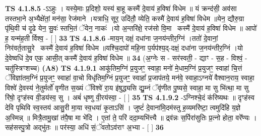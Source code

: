 \documentclass[17pt]{extarticle}
\begin{document}
                  \newline
                                \textbf{ TS 4.1.8.5} \newline
                  -ऽऽहुः । यस्ये॒माः प्र॒दिशो॒ यस्य॑ बा॒हू कस्मै॑ दे॒वाय॑ ह॒विषा॑ विधेम ॥ यं क्रन्द॑सी॒ अव॑सा तस्तभा॒ने अ॒भ्यैक्षे॑तां॒ मन॑सा॒ रेज॑माने ।यत्राधि॒ सूर॒ उदि॑तौ॒ व्येति॒ कस्मै॑ दे॒वाय॑ ह॒विषा॑ विधेम ॥येन॒ द्यौरु॒ग्रा पृ॑थि॒वी च॑ दृ॒ढे येन॒ सु॒वः॑ स्तभि॒तं ॅयेन॒ नाकः॑ ।यो अ॒न्तरि॑क्षे॒ रज॑सो वि॒मानः᳡कस्मै॑ दे॒वाय॑ ह॒विषा॑ विधेम ॥ आपो॑ ह॒ यन्म॑ह॒ती र्विश्व॒ - [  ] \textbf{  33} \newline
                  \newline
                                \textbf{ TS 4.1.8.6} \newline
                  -माय॒न् दक्षं॒ दधा॑ना ज॒नय॑न्तीर॒ग्निं ।ततो॑ दे॒वानां॒ निर॑वर्त॒तासु॒रेकः᳡कस्मै॑ दे॒वाय॑ ह॒विषा॑ विधेम ॥यश्चि॒दापो॑ महि॒ना प॒र्यप॑श्य॒द्-दक्षं॒ दधा॑ना ज॒नय॑न्तीर॒ग्निं ।यो दे॒वेष्वधि॑ दे॒व एक॒ आसी॒त् कस्मै॑ दे॒वाय॑ ह॒विषा॑ विधेम ॥ \textbf{  34} \newline
                  \newline
                      (अ॒ग्नेः स - सर॑स्वती॒ - द्याꣳ - स॒ह - विश्वं॒ - चतु॑स्त्रिꣳशच्च)  \textbf{(A8)} \newline \newline
                                        \textbf{ TS 4.1.9.1} \newline
                  आकू॑तिम॒ग्निं प्र॒युजꣳ॒॒ स्वाहा॒ मनो॑ मे॒धाम॒ग्निं प्र॒युजꣳ॒॒ स्वाहा॑ चि॒त्तं ॅविज्ञा॑तम॒ग्निं प्र॒युजꣳ॒॒ स्वाहा॑ वा॒चो विधृ॑तिम॒ग्निं प्र॒युजꣳ॒॒ स्वाहा᳚ प्र॒जाप॑तये॒ मन॑वे॒ स्वाहा॒ऽग्नये॑ वैश्वान॒राय॒ स्वाहा॒ विश्वे॑ दे॒वस्य॑ ने॒तुर्मर्तो॑ वृणीत स॒ख्यं ॅविश्वे॑ रा॒य इ॑षुद्ध्यसि द्यु॒म्नं ॅवृ॑णीत पु॒ष्यसे॒ स्वाहा॒ मा सु भि॑त्था॒ मा सु रि॑षो॒ दृꣳह॑स्व वी॒डय॑स्व॒ सु । अबं॑ धृष्णु वी॒रय॑स्वा॒ - [  ] \textbf{  35} \newline
                  \newline
                                \textbf{ TS 4.1.9.2} \newline
                  -ऽग्निश्चे॒दं क॑रिष्यथः ॥ दृꣳह॑स्व देवि पृथिवि स्व॒स्तय॑ आसु॒री मा॒या स्व॒धया॑ कृ॒ताऽसि॑ । जुष्टं॑ दे॒वाना॑मि॒दम॑स्तु ह॒व्यमरि॑ष्टा॒ त्वमुदि॑हि य॒ज्ञे अ॒स्मिन्न् ॥ मित्रै॒तामु॒खां त॑पै॒षा मा भे॑दि । ए॒तां ते॒ परि॑ ददा॒म्यभि॑त्त्यै ॥ द्र्व॑न्नः स॒र्पिरा॑सुतिः प्र॒त्नो होता॒ वरे᳚ण्यः । सह॑सस्पु॒त्रो अद्भु॑तः ॥ पर॑स्या॒ अधि॑ सं॒ॅवतोऽव॑राꣳ अ॒भ्या - [  ] \textbf{  36} \newline
                  \newline
\end{document}
